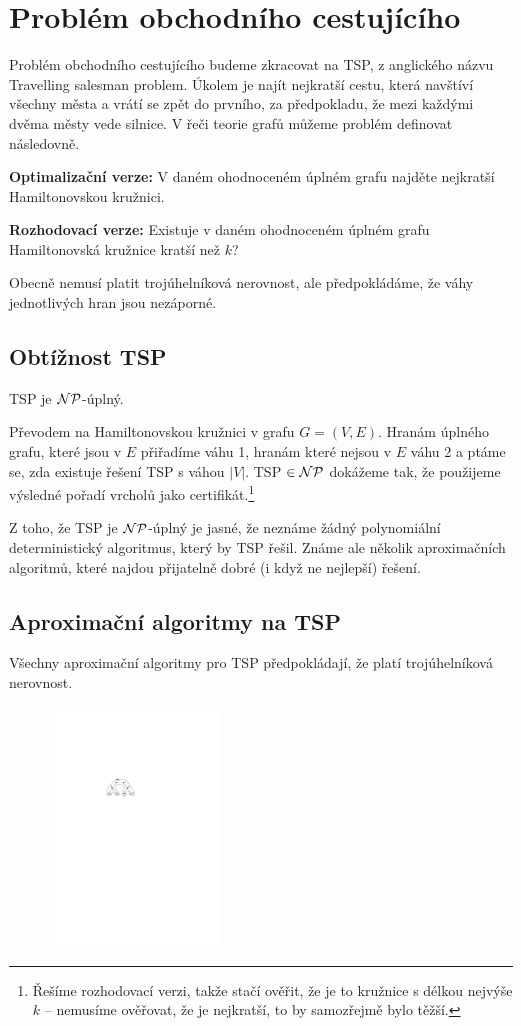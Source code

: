 \section{Problém obchodního cestujícího}

Problém obchodního cestujícího budeme zkracovat na TSP, z anglického názvu
Travelling salesman problem. Úkolem je najít nejkratší cestu, která navštíví
všechny města a vrátí se zpět do prvního, za předpokladu, že mezi každými dvěma
městy vede silnice. V řeči teorie grafů můžeme problém definovat následovně.

\medskip
\noindent\textbf{Optimalizační verze:} V daném ohodnoceném úplném grafu najděte
nejkratší Hamiltonovskou kružnici.

\noindent\textbf{Rozhodovací verze:} Existuje v daném ohodnoceném úplném grafu
Hamiltonovská kružnice kratší než $k$?
\medskip

Obecně nemusí platit trojúhelníková nerovnost, ale předpokládáme, že váhy
jednotlivých hran jsou nezáporné.

\subsection{Obtížnost TSP}

\vt TSP je $\mathcal{NP}$-úplný.

\dk Převodem na Hamiltonovskou kružnici v grafu $G = (V,E)$. Hranám úplného
grafu, které jsou v $E$ přiřadíme váhu 1, hranám které nejsou v $E$ váhu 2 a
ptáme se, zda existuje řešení TSP s váhou $|V|$. TSP $\in \mathcal{NP}$ dokážeme tak, že
použijeme výsledné pořadí vrcholů jako certifikát.\footnote{Řešíme rozhodovací
verzi, takže stačí ověřit, že je to kružnice s délkou nejvýše $k$ -- nemusíme
ověřovat, že je nejkratší, to by samozřejmě bylo těžší.}

Z toho, že TSP je $\mathcal{NP}$-úplný je jasné, že neznáme žádný polynomiální
deterministický algoritmus, který by TSP řešil. Známe ale několik aproximačních
algoritmů, které najdou přijatelně dobré (i když ne nejlepší) řešení.

\subsection{Aproximační algoritmy na TSP}

Všechny aproximační algoritmy pro TSP předpokládají, že platí trojúhelníková
nerovnost.

\begin{figure}
\centering
\vspace{-0.4cm}
\includegraphics[width=4.5cm]{img/tsp-aproximace.pdf}
\end{figure}

